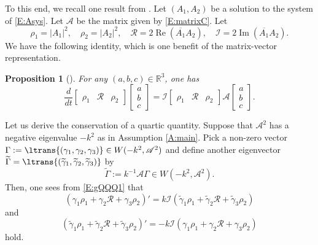\documentclass[11pt,a4paper,oneside]{amsart}
\theoremstyle{plain}
\newtheorem{proposition}[theorem]{Proposition}
\theoremstyle{remark}
\numberwithin{equation}{section}
\newcommand{\R}{\mathbb{R}}
\renewcommand{\Im}{\operatorname{Im}}
\renewcommand{\Re}{\operatorname{Re}}
\theoremstyle{definition}
\begin{document}
To this end, we recall one result from \cite{MSU2}.
Let $(A_1,A_2) $ be a solution to the system of \eqref{E:Asys}.
Let $\mathscr{A}$ be the matrix given by \eqref{E:matrixC}.
Let
\begin{equation}\label{E:quaddef}
	\rho_1 = |A_1|^2 , \quad \rho_2 = |A_2|^2, \quad \mathcal{R} = 2\Re (\overline{A_1} A_2), \quad \mathcal{I} = 2 \Im (\overline{A_1} A_2).
\end{equation}
We have the following identity, which is one benefit of the matrix-vector representation.
\begin{proposition}[\cite{MSU2}]\label{P:quadODE}
For any $(a,b,c) \in \R^3$, one has
\begin{equation}\label{E:gQQQ1}
	\frac{d}{dt} \begin{bmatrix} \rho_1 & \mathcal{R} & \rho_2  \end{bmatrix}
	\begin{bmatrix} a \\ b \\ c \end{bmatrix}
	= \mathcal{I} \begin{bmatrix} \rho_1 & \mathcal{R} & \rho_2  \end{bmatrix}
	\mathscr{A} \begin{bmatrix} a \\ b \\ c \end{bmatrix}.
\end{equation}
\end{proposition}
Let us derive the conservation of a quartic quantity.
Suppose that $\mathscr{A}^2$ has a negative eigenvalue $-k^2$ as in Assumption \ref{A:main}.
Pick a non-zero vector $\Gamma:=\ltrans{(\gamma_1,\gamma_2 ,\gamma_3)} \in W(-k^2,\mathscr{A}^2) $
and define another eigenvector
$\widetilde{\Gamma}=\ltrans{(	\widetilde{\gamma}_1,\widetilde{\gamma}_2,\widetilde{\gamma}_3
)}$ by
\begin{equation}\label{E:tgamma}
	\widetilde{\Gamma}
	:= k^{-1}\mathscr{A} \Gamma  \in W(-k^2,\mathscr{A}^2).
\end{equation}
Then, one sees from \eqref{E:gQQQ1} that
\[
	(\gamma_1 \rho_1 + \gamma_2 \mathcal{R} + \gamma_3 \rho_2)' = k \mathcal{I} (\widetilde{\gamma}_1 \rho_1 + \widetilde{\gamma}_2 \mathcal{R} + \widetilde{\gamma}_3 \rho_2)
\]
and
\[
	(\widetilde{\gamma}_1 \rho_1 + \widetilde{\gamma}_2 \mathcal{R} + \widetilde{\gamma}_3 \rho_2)'
 = - k \mathcal{I} (\gamma_1 \rho_1 + \gamma_2 \mathcal{R} + \gamma_3 \rho_2)
\]
hold.
\end{document}
